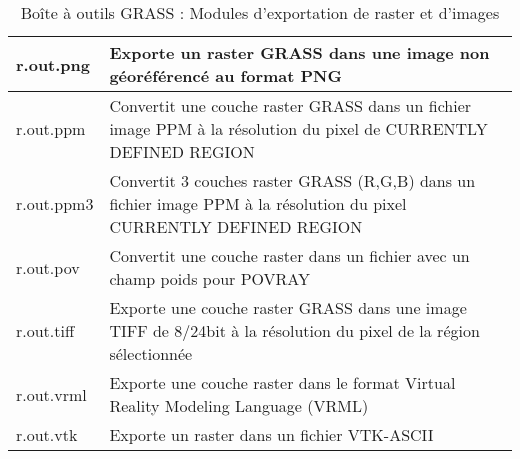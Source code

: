 \begin{table}[htb]
\begin{tabular}{|p{2.5cm}|p{11.5cm}|}
  \hline r.out.png & Exporte un raster GRASS dans une image non géoréférencé au format PNG \\
  \hline r.out.ppm & Convertit une couche raster GRASS dans un fichier image PPM à la résolution du pixel de CURRENTLY DEFINED REGION \\
  \hline r.out.ppm3 & Convertit 3 couches raster GRASS (R,G,B) dans un fichier image PPM à la résolution du pixel CURRENTLY DEFINED REGION \\
  \hline r.out.pov & Convertit une couche raster dans un fichier avec un champ poids pour POVRAY\\
  \hline r.out.tiff & Exporte une couche raster GRASS dans une image TIFF de 8/24bit à la résolution du pixel de la région sélectionnée\\
  \hline r.out.vrml & Exporte une couche raster dans le format Virtual Reality Modeling Language (VRML)\\
  \hline r.out.vtk & Exporte un raster dans un fichier VTK-ASCII \\
\hline
\end{tabular}
\caption{Boîte à outils GRASS : Modules d'exportation de raster et d'images}
\end{table}

